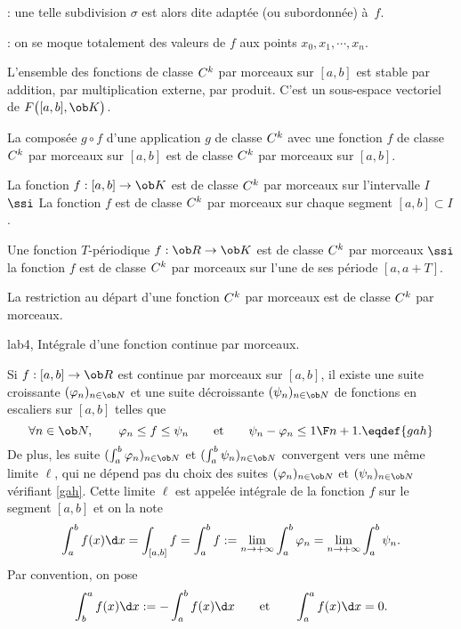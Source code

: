 \Remarque : une telle subdivision $\sigma$ est alors dite adaptée (ou subordonnée) à~$f$. 
\bigskip

\Remarque : on se moque totalement des valeurs de $f$ aux points $x_0, x_1, \cdots, x_n$. 
\bigskip

\Propriete [$a<b$, $k\in\overline{\ob N}$] L'ensemble des fonctions de classe $\sc C^k$ par morceaux sur $[a,b]$ 
est stable par addition, par multiplication externe, par produit. C'est un sous-espace vectoriel de $\sc F\big([a,b],\ob K\big)$. 

\Propriete [$a<b$, $k\in\overline{\ob N}$]
La composée $g\circ f$ d'une application $g$ de classe $\sc C^k$ avec une fonction $f$ de classe $\sc C^k$ 
par mor\-ceaux sur $[a,b]$ est de classe $\sc C^k$ par morceaux sur $[a,b]$. 

La fonction $f:[a,b]\to\ob K$ est de classe $\sc C^k$ par morceaux sur l'intervalle $I$ $\ssi $ La fonction $f$ est de classe $\sc C^k$ par morceaux sur chaque segment $[a,b]\subset I$. 

% 

\Definition [$k\in\overline{\ob N}$] 
Une fonction $T$-périodique $f:\ob R\to\ob K$ est de classe $\sc C^k$ par morceaux $\ssi $ la fonction $f$ est de classe $\sc C^k$ par morceaux sur l'une de ses période $[a,a+T]$. 

%

\Propriete [$k\in\overline{\ob N}$]
La restriction au départ d'une fonction $\sc C^k$ par morceaux est de classe $\sc C^k$ par morceaux. 

\Section lab4, Intégrale d'une fonction continue par morceaux. 

\Definition[$a< b$] 
Si $f:[a,b]\to\ob R$ est continue par morceaux sur $[a,b]$, il existe une suite croissante $(\varphi_n)_{n\in\ob N}$ et une suite décroissante $(\psi_n)_{n\in\ob N}$ de fonctions en escaliers sur $[a,b]$ telles que 
$$
\forall n\in\ob N, \qquad \varphi_n\le f\le \psi_n\qquad\mbox{et}\qquad \psi_n-\varphi_n\le {1\F n+1}.\eqdef{gah}
$$
De plus, les suite $(\int_a^b\varphi_n)_{n\in\ob N}$ et $(\int_a^b\psi_n)_{n\in\ob N}$ convergent vers une même limite $\ell$, qui ne dépend pas du choix des suites $(\varphi_n)_{n\in\ob N}$ et $(\psi_n)_{n\in\ob N}$ vérifiant \eqref{gah}. \pn
Cette limite $\ell$ est appelée intégrale de la fonction $f$ sur le segment $[a,b]$ et on la note
$$
\int_a^bf(x)\d x=\int_{[a,b]}f= \int_a^bf:=\lim_{n\to+\infty}\int_a^b\varphi_n=\lim_{n\to+\infty}\int_a^b\psi_n.
$$
Par convention, on pose 
$$
\int_b^af(x)\d x:=-\int_a^bf(x)\d x\qquad \mbox{et}\qquad \int_a^af(x)\d x=0.
$$

